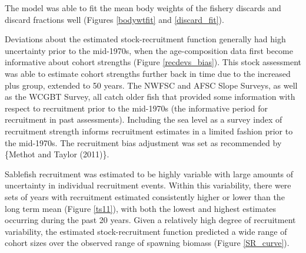 \documentclass[11pt,
  english,
  a4paper,
]{article}
\begin{document}

The model was able to fit the mean body weights of the fishery discards and discard fractions well (Figures \ref{bodywtfit} and \ref{discard_fit}).

\leavevmode\tagmcend\tagstructend\par


Deviations about the estimated stock-recruitment function generally had high uncertainty prior to the mid-1970s, when the age-composition data first become informative about cohort strengths (Figure \ref{recdevs_bias}). This stock assessment was able to estimate cohort strengths further back in time due to the increased plus group, extended to 50 years. The NWFSC and AFSC Slope Surveys, as well as the WCGBT Survey, all catch older fish that provided some information with respect to recruitment prior to the mid-1970s (the informative period for recruitment in past assessments). Including the sea level as a survey index of recruitment strength informs recruitment estimates in a limited fashion prior to the mid-1970s. The recruitment bias adjustment was set as recommended by \{{Methot and Taylor (2011)\leavevmode\tagmcend\tagstructend}\}.

\leavevmode\tagmcend\tagstructend\par


Sablefish recruitment was estimated to be highly variable with large amounts of uncertainty in individual recruitment events. Within this variability, there were sets of years with recruitment estimated consistently higher or lower than the long term mean (Figure \ref{ts11}), with both the lowest and highest estimates occurring during the past 20 years. Given a relatively high degree of recruitment variability, the estimated stock-recruitment function predicted a wide range of cohort sizes over the observed range of spawning biomass (Figure \ref{SR_curve}).

\leavevmode\tagmcend\tagstructend\par

\end{document}
